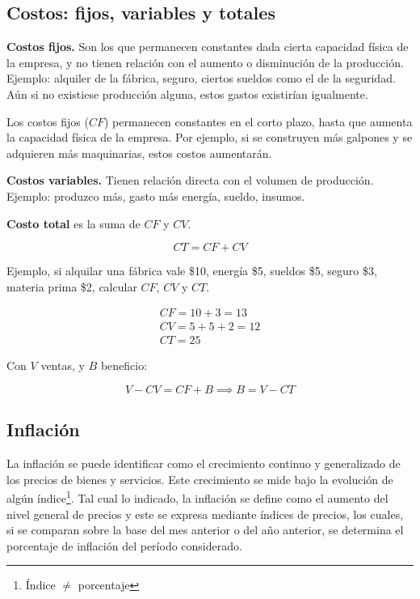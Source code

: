 \subsection{Costos: fijos, variables y totales}

\textbf{Costos fijos.}
Son los que permanecen constantes dada cierta capacidad física de la empresa,
y no tienen relación con el aumento o disminución de la producción.
Ejemplo:
alquiler de la fábrica,
seguro,
ciertos sueldos como el de la seguridad.
Aún si no existiese producción alguna,
estos gastos existirían igualmente.

Los costos fijos (\(CF\)) permanecen constantes en el corto plazo,
hasta que aumenta la capacidad física de la empresa.
Por ejemplo, 
si se construyen más galpones y se adquieren más maquinarias,
estos costos aumentarán.

\textbf{Costos variables.}
Tienen relación directa con el volumen de producción.
Ejemplo: produzco más, gasto más energía, sueldo, insumos.

\textbf{Costo total} es la suma de \(CF\) y \(CV\).

\begin{equation*}
    CT = CF + CV
\end{equation*}

Ejemplo, si alquilar una fábrica vale \$10,
energía \$5, sueldos \$5, seguro \$3, materia prima \$2,
calcular \(CF\), \(CV\) y \(CT\).

\begin{align*}
    CF = 10 + 3 = 13 \\
    CV = 5 + 5 + 2 = 12 \\
    CT = \boxed{25}
\end{align*}

Con \(V\) ventas, y \(B\) beneficio:

\begin{equation*}
    V - CV = CF + B \implies B = V - CT
\end{equation*}

\subsection{Inflación}

La inflación se puede identificar como el crecimiento continuo y generalizado de 
los precios de bienes y servicios.
Este crecimiento se mide bajo la evolución de algún índice\footnote{Índice \(\neq\) porcentaje}.
Tal cual lo indicado, 
la inflación se define como el aumento del nivel general de precios
y este se expresa mediante índices de precios, 
los cuales,
si se comparan sobre la base del mes anterior o del año anterior,
se determina el porcentaje de inflación del período considerado.


